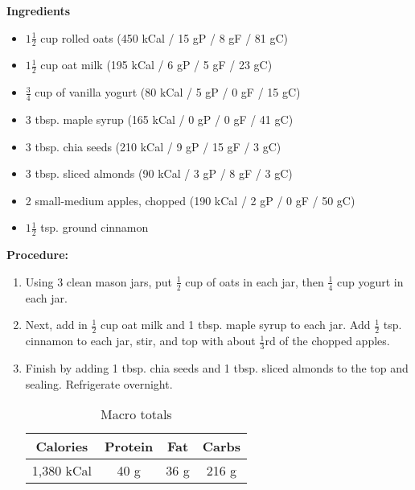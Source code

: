 \begin{multicols}{2}
\textbf{Ingredients}
\begin{itemize}
\item $1\frac{1}{2}$ cup rolled oats \quad (450 kCal / 15 gP / 8 gF / 81 gC)
\item $1\frac{1}{2}$ cup oat milk \quad (195 kCal / 6 gP / 5 gF / 23 gC) 
\item $\frac{3}{4}$ cup of vanilla yogurt \newline (80 kCal / 5 gP / 0 gF / 15 gC) 
\item 3 tbsp. maple syrup \quad (165 kCal / 0 gP / 0 gF / 41 gC)
\item 3 tbsp. chia seeds \quad (210 kCal / 9 gP / 15 gF / 3 gC)
\item 3 tbsp. sliced almonds \quad (90 kCal / 3 gP / 8 gF / 3 gC) 
\item 2 small-medium apples, chopped \newline (190 kCal / 2 gP / 0 gF / 50 gC)
\item $1\frac{1}{2}$ tsp. ground cinnamon




\end{itemize}


\columnbreak
\textbf{Procedure:}
\medskip


\begin{enumerate}
\item Using 3 clean mason jars, put $\frac{1}{2}$ cup of oats in each jar, then $\frac{1}{4}$ cup yogurt in each jar. 

\item Next, add in $\frac{1}{2}$ cup oat milk and 1 tbsp. maple syrup to each jar. Add $\frac{1}{2}$ tsp. cinnamon to each jar, stir, and top with about $\frac{1}{3}$rd of the chopped apples. 

\item Finish by adding 1 tbsp. chia seeds and 1 tbsp. sliced almonds to the top and sealing. Refrigerate overnight.

\begin{table}[H]
  \begin{center}
    \caption{Macro totals}
    \label{tab:table1}
    \begin{tabular}{c|c|c|c} %
      \textbf{Calories} & \textbf{Protein} & \textbf{Fat} & \textbf{Carbs}\\
      \hline
      1,380 kCal & 40 g & 36 g & 216 g\\
    \end{tabular}
  \end{center}
\end{table}
 
\end{enumerate}
\end{multicols}